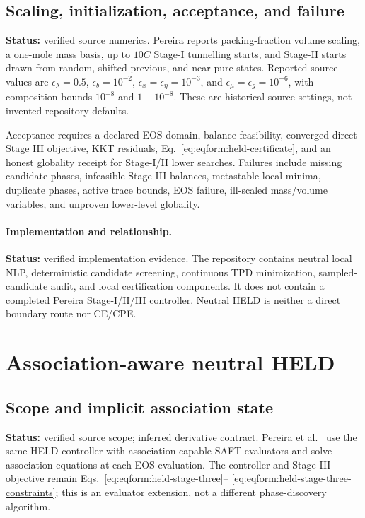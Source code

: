 \documentclass[11pt]{article}
\newcommand{\Evidence}[1]{\textsf{#1}}
\newcommand{\Status}[1]{\textbf{Status:} \Evidence{#1}.}
\begin{document}
\subsection{Scaling, initialization, acceptance, and failure}

\Status{verified source numerics}
Pereira reports packing-fraction volume scaling, a one-mole mass basis, up to
\(10C\) Stage-I tunnelling starts, and Stage-II starts drawn from random,
shifted-previous, and near-pure states. Reported source values are
\(\epsilon_\lambda=0.5\), \(\epsilon_b=10^{-2}\),
\(\epsilon_x=\epsilon_\eta=10^{-3}\), and
\(\epsilon_\mu=\epsilon_g=10^{-6}\), with composition bounds
\(10^{-8}\) and \(1-10^{-8}\). These are historical source settings, not
invented repository defaults.

Acceptance requires a declared EOS domain, balance feasibility, converged
direct Stage III objective, KKT residuals, Eq.~\eqref{eq:eqform:held-certificate},
and an honest globality receipt for Stage-I/II lower searches. Failures include
missing candidate phases, infeasible Stage III balances, metastable local
minima, duplicate phases, active trace bounds, EOS failure, ill-scaled
mass/volume variables, and unproven lower-level globality.

\paragraph{Implementation and relationship.}
\Status{verified implementation evidence}
The repository contains neutral local NLP, deterministic candidate screening,
continuous TPD minimization, sampled-candidate audit, and local certification
components. It does not contain a completed Pereira Stage-I/II/III controller.
Neutral HELD is neither a direct boundary route nor CE/CPE.

\section{Association-aware neutral HELD}
\label{sec:eqform:association-held}

\subsection{Scope and implicit association state}

\Status{verified source scope; inferred derivative contract}
Pereira et al.~\cite{Pereira2012} use the same HELD controller with
association-capable SAFT evaluators and solve association equations at each EOS
evaluation. The controller and Stage III objective remain
Eqs.~\eqref{eq:eqform:held-stage-three}--%
\eqref{eq:eqform:held-stage-three-constraints}; this is an evaluator extension,
not a different phase-discovery algorithm.
\end{document}
